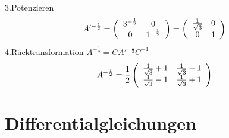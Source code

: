 \documentclass{article}
\begin{document}
3.Potenzieren
\begin{eqnarray*}
    A'^{-\frac{1}{2}}=\left(\begin{array}{c c}
        3^{-\frac{1}{2}}&0\\0&1^{-\frac{1}{2}}
    \end{array}\right) = \left(\begin{array}{c c}
        \frac{1}{\sqrt{3}}&0\\0&1
    \end{array}\right)
\end{eqnarray*}
4.Rücktransformation $A^{-\frac{1}{2}} = CA'^{-\frac{1}{2}}C^{-1}$
\begin{eqnarray*}
    A^{-\frac{1}{2}} = \frac{1}{2}\left(\begin{array}{c c}
        \frac{1}{\sqrt{3}}+1&\frac{1}{\sqrt{3}}-1\\
        \frac{1}{\sqrt{3}}-1&\frac{1}{\sqrt{3}}+1
    \end{array}\right)
\end{eqnarray*}

\section{Differentialgleichungen}
\end{document}
